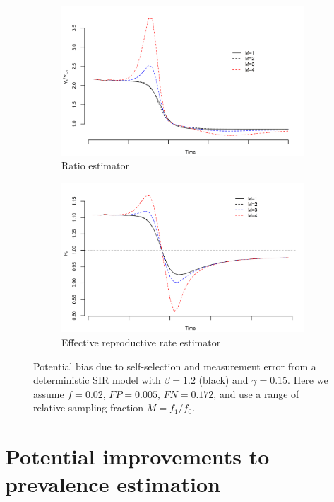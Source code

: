 \documentclass[11pt]{amsart}
\begin{document}
\begin{figure}
\centering
\begin{subfigure}{.5\textwidth}
  \centering
  \includegraphics[width=.9\linewidth]{../methods/figs/sir_ratio.png}
  \caption{Ratio estimator}
  \label{fig:ratio-bias}
\end{subfigure}%
\begin{subfigure}{.5\textwidth}
  \centering
  \includegraphics[width=.9\linewidth]{../methods/figs/sir_rt.png}
  \caption{Effective reproductive rate estimator}
  \label{fig:r0-bias}
\end{subfigure}
\caption{Potential bias due to self-selection and measurement error from a deterministic SIR model with $\beta = 1.2$ (black) and $\gamma = 0.15$.  Here we assume $f = 0.02$, $FP = 0.005$, $FN = 0.172$, and use a range of relative sampling fraction $M = f_1/f_0$.}
\label{fig:rates}
\end{figure}

\section{Potential improvements to prevalence estimation}
\label{section:improvedcasecount}
\end{document}
